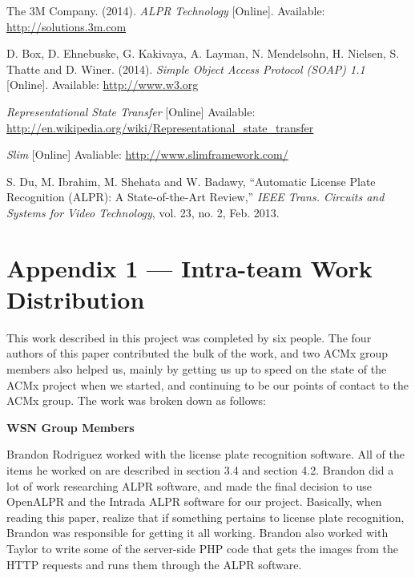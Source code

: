 \documentclass[11pt, oneside, fullpage, doublespace]{article}
\begin{document}
\begin{thebibliography}{99}
 The 3M Company. (2014). \emph{ALPR Technology} [Online]. Available: \url{http://solutions.3m.com}

 D. Box, D. Ehnebuske, G. Kakivaya, A. Layman, N. Mendelsohn, H. Nielsen, S. Thatte and D. Winer. (2014). \emph{Simple Object Access Protocol (SOAP) 1.1} [Online]. Available: \url{http://www.w3.org}

 \emph{Representational State Transfer} [Online] Available: \url{http://en.wikipedia.org/wiki/Representational_state_transfer}

 \emph{Slim} [Online] Avaliable: \url{http://www.slimframework.com/}

 S. Du, M. Ibrahim, M. Shehata and W. Badawy, ``Automatic License Plate Recognition (ALPR): A State-of-the-Art Review,'' \emph{IEEE Trans. Circuits and Systems for Video Technology}, vol. 23, no. 2, Feb. 2013.

\end{thebibliography}


\section*{Appendix 1 --- Intra-team Work Distribution}

This work described in this project was completed by six people. The four authors of this paper contributed the bulk of the work, and two ACMx group members also helped us, mainly by getting us up to speed on the state of the ACMx project when we started, and continuing to be our points of contact to the ACMx group. The work was broken down as follows:

\textbf{WSN Group Members}

Brandon Rodriguez worked with the license plate recognition software. All of the items he worked on are described in section 3.4 and section 4.2. Brandon did a lot of work researching ALPR software, and made the final decision to use OpenALPR and the Intrada ALPR software for our project. Basically, when reading this paper, realize that if something pertains to license plate recognition, Brandon was responsible for getting it all working. Brandon also worked with Taylor to write some of the server-side PHP code that gets the images from the HTTP requests and runs them through the ALPR software.
\end{document}
